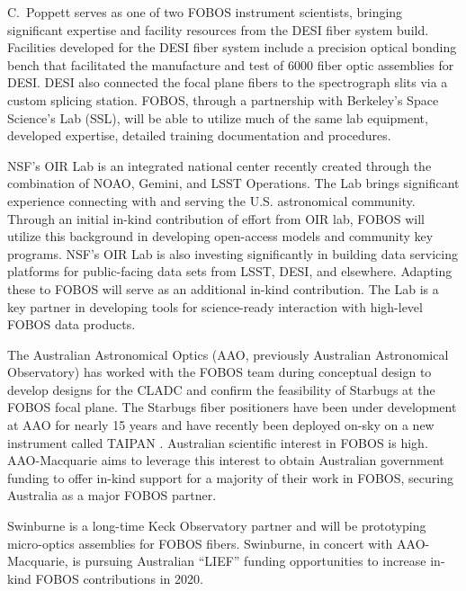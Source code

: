 \documentclass[oneside,11pt]{amsart}
\begin{document}
 C.~Poppett serves
as one of two FOBOS instrument scientists, bringing significant
expertise and facility resources from the DESI fiber system build.
Facilities developed for the DESI fiber system include a precision
optical bonding bench that facilitated the manufacture and test of
6000 fiber optic assemblies for DESI. DESI also connected the focal
plane fibers to the spectrograph slits via a custom splicing station.
FOBOS, through a partnership with Berkeley's Space Science's Lab
(SSL), will be able to utilize much of the same lab equipment,
developed expertise, detailed training documentation and procedures.

 NSF’s OIR Lab is an integrated
national center recently created through the combination of NOAO,
Gemini, and LSST Operations. The Lab brings significant experience
connecting with and serving the U.S. astronomical community. Through
an initial in-kind contribution of effort from OIR lab, FOBOS will
utilize this background in developing open-access models and
community key programs. NSF’s OIR Lab is also investing significantly
in building data servicing platforms for public-facing data sets from
LSST, DESI, and elsewhere. Adapting these to FOBOS will serve as an
additional in-kind contribution. The Lab is a key partner in
developing tools for science-ready interaction with high-level FOBOS
data products.

 The
Australian Astronomical Optics (AAO, previously Australian
Astronomical Observatory) has worked with the FOBOS team during
conceptual design to develop designs for the CLADC and confirm the
feasibility of Starbugs at the FOBOS focal plane. The Starbugs fiber
positioners have been under development at AAO for nearly 15 years
and have recently been deployed on-sky on a new instrument called
TAIPAN \citep{staszak16}. Australian scientific interest in FOBOS is
high. AAO-Macquarie aims to leverage this interest to obtain
Australian government funding to offer in-kind support for a majority
of their work in FOBOS, securing Australia as a major FOBOS partner.

 Swinburne is a long-time
Keck Observatory partner and will be prototyping micro-optics
assemblies for FOBOS fibers. Swinburne, in concert with
AAO-Macquarie, is pursuing Australian ``LIEF'' funding opportunities
to increase in-kind FOBOS contributions in 2020.
\end{document}
